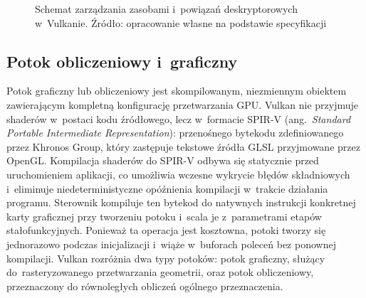 \begin{figure}[ht]
\centering
{}
\caption{Schemat zarządzania zasobami i~powiązań deskryptorowych w~Vulkanie. Źródło: opracowanie własne na podstawie specyfikacji \cite{vulkan-spec}}
\label{fig:vulkan_resources}
\end{figure}

\subsection{Potok obliczeniowy i~graficzny}
\label{subsec:pipeline}

Potok graficzny lub obliczeniowy jest skompilowanym, niezmiennym obiektem zawierającym
kompletną konfigurację przetwarzania GPU. Vulkan nie przyjmuje shaderów w~postaci kodu
źródłowego, lecz w~formacie SPIR-V (ang.~\textit{Standard Portable Intermediate
Representation}): przenośnego bytekodu zdefiniowanego przez Khronos Group, który zastępuje
tekstowe źródła GLSL przyjmowane przez OpenGL. Kompilacja shaderów do SPIR-V odbywa się
statycznie przed uruchomieniem aplikacji, co umożliwia wczesne wykrycie błędów składniowych
i~eliminuje niedeterministyczne opóźnienia kompilacji w~trakcie działania programu.
Sterownik kompiluje ten bytekod do natywnych instrukcji konkretnej karty graficznej przy
tworzeniu potoku i~scala je z~parametrami etapów stałofunkcyjnych. Ponieważ ta operacja
jest kosztowna, potoki tworzy się jednorazowo podczas inicjalizacji i~wiąże w~buforach
poleceń bez ponownej kompilacji. Vulkan rozróżnia dwa typy potoków: potok graficzny,
służący do~rasteryzowanego przetwarzania geometrii, oraz potok obliczeniowy, przeznaczony
do równoległych obliczeń ogólnego przeznaczenia.

